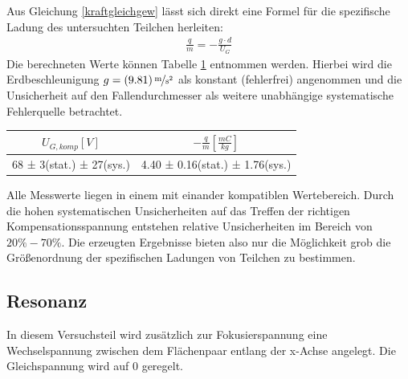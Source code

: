 \documentclass[a4paper,12pt]{article}
\begin{document}
Aus Gleichung \ref{kraftgleichgew} lässt sich direkt eine Formel für die spezifische Ladung des untersuchten Teilchen herleiten:
\begin{align}\label{zspezm}
	\frac{q}{m} = -\frac{g \cdot  d}{U_{G}}
\end{align}
Die berechneten Werte können Tabelle \ref{tab:z-komp-result} entnommen werden. Hierbei wird die Erdbeschleunigung 
$g = \unitfrac[(9.81)]{m}{s^2}$ als konstant (fehlerfrei) angenommen und die Unsicherheit auf den Fallendurchmesser als weitere
unabhängige systematische Fehlerquelle betrachtet.


\begin{table}[h]
	\centering
	\begin{tabular}{ c | c }
		$U_{G,komp} [V] $ & $-\frac{q}{m}[\frac{mC}{kg}]$ \\
		\hline
		  68 ± 3(stat.) ± 27(sys.) &  4.40 ± 0.16(stat.) ± 1.76(sys.)  \\
	\end{tabular}
	\label{tab:z-komp-result}
\end{table}

Alle Messwerte liegen in einem mit einander kompatiblen Wertebereich. Durch die hohen systematischen Unsicherheiten auf das
Treffen der richtigen Kompensationsspannung entstehen relative Unsicherheiten im Bereich von $20\% - 70 \%$. Die erzeugten
Ergebnisse bieten also nur die Möglichkeit grob die Größenordnung der spezifischen Ladungen von Teilchen zu bestimmen.

\subsection{Resonanz}
In diesem Versuchsteil wird zusätzlich zur Fokusierspannung eine Wechselspannung zwischen dem Flächenpaar entlang der x-Achse angelegt.
Die Gleichspannung wird auf $0$ geregelt.
\end{document}
